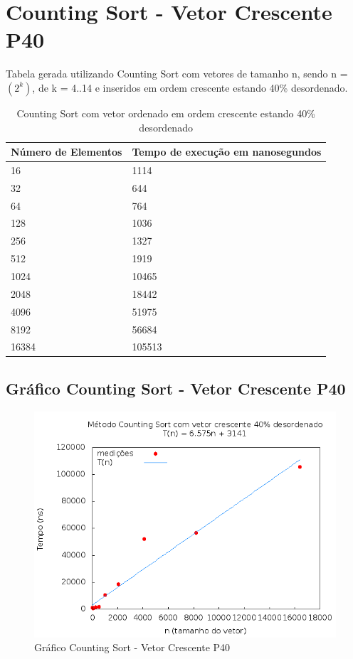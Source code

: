\documentclass[12pt,a4paper,twoside]{report}
\begin{document}
\section{Counting Sort - Vetor Crescente P40}
Tabela gerada utilizando Counting Sort com vetores de tamanho n, sendo n = $(2^k)$, de k = 4..14 e inseridos em ordem crescente estando 40\% desordenado.
\begin{table}[H]
\centering
\caption{Counting Sort com vetor ordenado em ordem crescente estando 40\% desordenado}
\label{my-label}
\begin{tabular}{|l|l|}
\hline
\multicolumn{1}{|c|}{\textbf{Número de Elementos}} & \multicolumn{1}{c|}{\textbf{Tempo de execução em nanosegundos}} \\ \hline
16 & 1114 \\ \hline
32 & 644 \\ \hline
64 & 764 \\ \hline
128 & 1036 \\ \hline
256 & 1327 \\ \hline
512 & 1919 \\ \hline
1024 & 10465 \\ \hline
2048 & 18442 \\ \hline
4096 & 51975 \\ \hline
8192 & 56684 \\ \hline
16384 & 105513 \\ \hline
\end{tabular}
\end{table}

\subsection{Gráfico Counting Sort - Vetor Crescente P40}
\begin{figure}[H]
    \centering
    \includegraphics[width=0.7\linewidth]{graficos/CountingSort/vIntCrescenteP40/vIntCrescenteP40.png}
  \caption{Gráfico Counting Sort - Vetor Crescente P40}
\end{figure}
\end{document}
